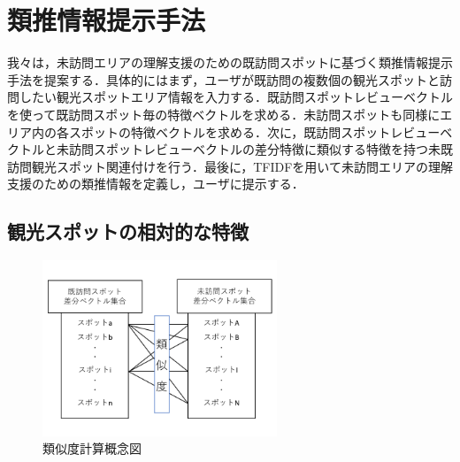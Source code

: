 \documentclass{deimj}
\begin{document}
\section{類推情報提示手法}
\label{sec:Analogical Information Presentation Method}
我々は，未訪問エリアの理解支援のための既訪問スポットに基づく類推情報提示手法を提案する．具体的にはまず，ユーザが既訪問の複数個の観光スポットと訪問したい観光スポットエリア情報を入力する．既訪問スポットレビューベクトルを使って既訪問スポット毎の特徴ベクトルを求める．未訪問スポットも同様にエリア内の各スポットの特徴ベクトルを求める．次に，既訪問スポットレビューベクトルと未訪問スポットレビューベクトルの差分特徴に類似する特徴を持つ未既訪問観光スポット関連付けを行う．最後に，TFIDFを用いて未訪問エリアの理解支援のための類推情報を定義し，ユーザに提示する．

\subsection{観光スポットの相対的な特徴}
\label{subsec:Relative features of sightseeing spots}

\begin{figure}[t]
  \begin{center}
    \includegraphics[clip,width=7.0cm]{picture/Photo_CosSim.png}
    \caption{類似度計算概念図}
    \label{fig:photo_exp}
    \end{center}
\end{figure}
\end{document}

